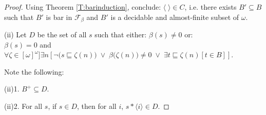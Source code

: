 \documentclass[a4paper]{amsart}
\theoremstyle{plain}
\begin{document}
\begin{proof}
\smallskip Using Theorem \ref{T:barinduction},  conclude: $\langle\;\rangle \in C$, i.e. there exists $B'\subseteq B$ such that $B'$ is  bar in $\mathcal{F}_\beta$ and $B'$ is a decidable and almost-finite subset of $\omega$.

\medskip (ii) Let $D$ be the set of all $s$ such that either: $\beta(s)\neq 0$ or:\\ $\beta(s)=0$ and $\forall \zeta \in [\omega]^\omega]\exists n[\neg\bigl(s\sqsubseteq \zeta(n)\bigr)\;\vee\;\beta\bigl(\zeta(n)\bigr)\neq 0\;\vee\;\exists t\sqsubseteq \zeta(n)[t\in B]]$.  

 \smallskip Note the following:

(ii)1. $B^+\subseteq D$.

(ii)2. For all $s$, if $s\in D$, then for all $i$, $s\ast\langle i \rangle \in D$.


\end{proof}
\end{document}
